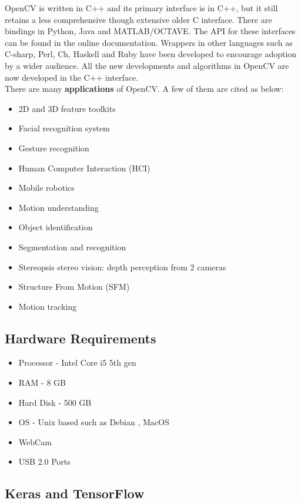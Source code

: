 OpenCV is written in C++ and its primary interface is in C++, but it still retains a less comprehensive though extensive older C interface. There are bindings in Python, Java and MATLAB/OCTAVE. The API for these interfaces	can be found in the online documentation. Wrappers in other languages such as C-sharp, Perl, Ch, Haskell and Ruby have been developed to encourage adoption by a wider audience. All the new developments and algorithms in OpenCV are now developed in the C++ interface.\\
There are many \textbf{applications} of OpenCV. A few of them are cited as below:
\begin{itemize}
\item 2D and 3D feature toolkits 
\item Facial recognition system 
\item Gesture recognition 
\item Human Computer Interaction (HCI) 
\item Mobile robotics 
\item Motion understanding 
\item Object identification 
\item Segmentation and recognition 
\item Stereopsis stereo vision: depth perception from 2 cameras 
\item Structure From Motion (SFM) 
\item Motion tracking 
\end{itemize}
\subsection{Hardware Requirements}
\begin{itemize}
	\item Processor - Intel Core i5 5th gen
	\item RAM - 8 GB
	\item Hard Disk - 500 GB
	\item OS - Unix based such as Debian , MacOS
	\item WebCam
	\item USB 2.0 Ports
\end{itemize}
\subsection{Keras and TensorFlow}
